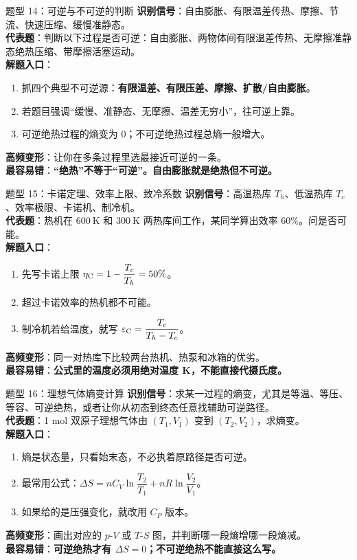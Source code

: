 \documentclass[11pt,a4paper]{ctexart}
\newcommand{\key}[1]{\textcolor{theme}{\textbf{#1}}}
\newcommand{\warn}[1]{\textcolor{red!70!black}{\textbf{#1}}}
\begin{document}
\begin{typebox}{题型 14：可逆与不可逆的判断}
\textbf{识别信号}：自由膨胀、有限温差传热、摩擦、节流、快速压缩、缓慢准静态。\\
\textbf{代表题}：判断以下过程是否可逆：自由膨胀、两物体间有限温差传热、无摩擦准静态绝热压缩、带摩擦活塞运动。\\
\textbf{解题入口}：
\begin{enumerate}
  \item 抓四个典型不可逆源：\key{有限温差、有限压差、摩擦、扩散/自由膨胀}。
  \item 若题目强调“缓慢、准静态、无摩擦、温差无穷小”，往可逆上靠。
  \item 可逆绝热过程的熵变为 0；不可逆绝热过程总熵一般增大。
\end{enumerate}
\textbf{高频变形}：让你在多条过程里选最接近可逆的一条。\\
\textbf{最容易错}：\warn{“绝热”不等于“可逆”。自由膨胀就是绝热但不可逆。}
\end{typebox}

\begin{typebox}{题型 15：卡诺定理、效率上限、致冷系数}
\textbf{识别信号}：高温热库 \(T_h\)、低温热库 \(T_c\)、效率极限、卡诺机、制冷机。\\
\textbf{代表题}：热机在 \(600\ \mathrm{K}\) 和 \(300\ \mathrm{K}\) 两热库间工作，某同学算出效率 \(60\%\)。问是否可能。\\
\textbf{解题入口}：
\begin{enumerate}
  \item 先写卡诺上限 \(\eta_{\rm C}=1-\dfrac{T_c}{T_h}=50\%\)。
  \item 超过卡诺效率的热机都不可能。
  \item 制冷机若给温度，就写 \(\varepsilon_{\rm C}=\dfrac{T_c}{T_h-T_c}\)。
\end{enumerate}
\textbf{高频变形}：同一对热库下比较两台热机、热泵和冰箱的优劣。\\
\textbf{最容易错}：\warn{公式里的温度必须用绝对温度 K，不能直接代摄氏度。}
\end{typebox}

\begin{typebox}{题型 16：理想气体熵变计算}
\textbf{识别信号}：求某一过程的熵变，尤其是等温、等压、等容、可逆绝热，或者让你从初态到终态任意找辅助可逆路径。\\
\textbf{代表题}：1 mol 双原子理想气体由 \((T_1,V_1)\) 变到 \((T_2,V_2)\)，求熵变。\\
\textbf{解题入口}：
\begin{enumerate}
  \item 熵是状态量，只看始末态，不必执着原路径是否可逆。
  \item 最常用公式：\(\Delta S=nC_V\ln\dfrac{T_2}{T_1}+nR\ln\dfrac{V_2}{V_1}\)。
  \item 如果给的是压强变化，就改用 \(C_P\) 版本。
\end{enumerate}
\textbf{高频变形}：画出对应的 \(p\)-\(V\) 或 \(T\)-\(S\) 图，并判断哪一段熵增哪一段熵减。\\
\textbf{最容易错}：\warn{可逆绝热才有 \(\Delta S=0\)；不可逆绝热不能直接这么写。}
\end{typebox}
\end{document}
